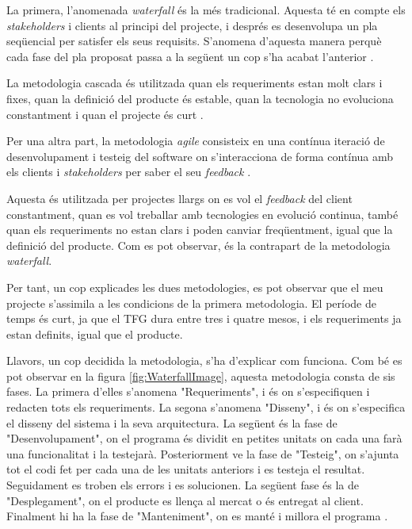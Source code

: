 \documentclass[a4paper]{article}
\begin{document}
La primera, l'anomenada \textit{waterfall} és la més tradicional. Aquesta té en compte els \textit{stakeholders} i clients al principi del projecte, i després es desenvolupa un pla seqüencial per satisfer els seus requisits. S'anomena d'aquesta manera perquè cada fase del pla proposat passa a la següent un cop s'ha acabat l'anterior \cite{waterfallModel}.

La metodologia cascada és utilitzada quan els requeriments estan molt clars i fixes, quan la definició del producte és estable, quan la tecnologia no evoluciona constantment i quan el projecte és curt \cite{waterfallTutorialsPoint}.

Per una altra part, la metodologia \textit{agile} consisteix en una contínua iteració de desenvolupament i testeig del software on s'interacciona de forma contínua amb els clients i \textit{stakeholders} per saber el seu \textit{feedback} \cite{agileVsWaterfall}.

Aquesta és utilitzada per projectes llargs on es vol el \textit{feedback} del client constantment, quan es vol treballar amb tecnologies en evolució continua, també quan els requeriments no estan clars i poden canviar freqüentment, igual que la definició del producte. Com es pot observar, és la contrapart de la metodologia \textit{waterfall}. 

Per tant, un cop explicades les dues metodologies, es pot observar que el meu projecte s'assimila a les condicions de la primera metodologia. El període de temps és curt, ja que el TFG dura entre tres i quatre mesos, i els requeriments ja estan definits, igual que el producte.

Llavors, un cop decidida la metodologia, s'ha d'explicar com funciona. Com bé es pot observar en la figura \ref{fig:WaterfallImage}, aquesta metodologia consta de sis fases. La primera d'elles s'anomena "Requeriments", i és on s'especifiquen i redacten tots els requeriments. La segona s'anomena "Disseny", i és on s'especifica el disseny del sistema i la seva arquitectura. La següent és la fase de "Desenvolupament", on el programa és dividit en petites unitats on cada una farà una funcionalitat i la testejarà. Posteriorment ve la fase de "Testeig", on s'ajunta tot el codi fet per cada una de les unitats anteriors i es testeja el resultat. Seguidament es troben els errors i es solucionen. La següent fase és la de "Desplegament", on el producte es llença al mercat o és entregat al client. Finalment hi ha la fase de "Manteniment", on es manté i millora el programa \cite{waterfallImage}. 
\end{document}

